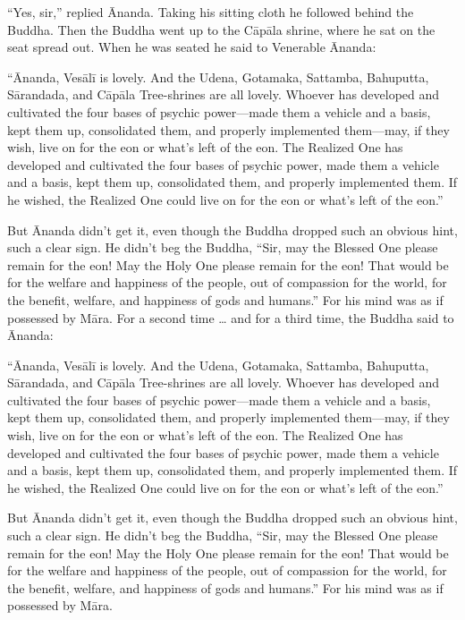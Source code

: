 \documentclass[12pt,openany]{book}%
\begin{document}
“Yes, sir,” replied Ānanda. Taking his sitting cloth he followed behind the Buddha. Then the Buddha went up to the \textsanskrit{Cāpāla} shrine, where he sat on the seat spread out. When he was seated he said to Venerable Ānanda: 

“Ānanda, \textsanskrit{Vesālī} is lovely. And the Udena, Gotamaka, Sattamba, Bahuputta, \textsanskrit{Sārandada}, and \textsanskrit{Cāpāla} Tree-shrines are all lovely. Whoever has developed and cultivated the four bases of psychic power—made them a vehicle and a basis, kept them up, consolidated them, and properly implemented them—may, if they wish, live on for the eon or what’s left of the eon. The Realized One has developed and cultivated the four bases of psychic power, made them a vehicle and a basis, kept them up, consolidated them, and properly implemented them. If he wished, the Realized One could live on for the eon or what’s left of the eon.” 

But Ānanda didn’t get it, even though the Buddha dropped such an obvious hint, such a clear sign. He didn’t beg the Buddha, “Sir, may the Blessed One please remain for the eon! May the Holy One please remain for the eon! That would be for the welfare and happiness of the people, out of compassion for the world, for the benefit, welfare, and happiness of gods and humans.” For his mind was as if possessed by \textsanskrit{Māra}. For a second time … and for a third time, the Buddha said to Ānanda: 

“Ānanda, \textsanskrit{Vesālī} is lovely. And the Udena, Gotamaka, Sattamba, Bahuputta, \textsanskrit{Sārandada}, and \textsanskrit{Cāpāla} Tree-shrines are all lovely. Whoever has developed and cultivated the four bases of psychic power—made them a vehicle and a basis, kept them up, consolidated them, and properly implemented them—may, if they wish, live on for the eon or what’s left of the eon. The Realized One has developed and cultivated the four bases of psychic power, made them a vehicle and a basis, kept them up, consolidated them, and properly implemented them. If he wished, the Realized One could live on for the eon or what’s left of the eon.” 

But Ānanda didn’t get it, even though the Buddha dropped such an obvious hint, such a clear sign. He didn’t beg the Buddha, “Sir, may the Blessed One please remain for the eon! May the Holy One please remain for the eon! That would be for the welfare and happiness of the people, out of compassion for the world, for the benefit, welfare, and happiness of gods and humans.” For his mind was as if possessed by \textsanskrit{Māra}. 
\end{document}

